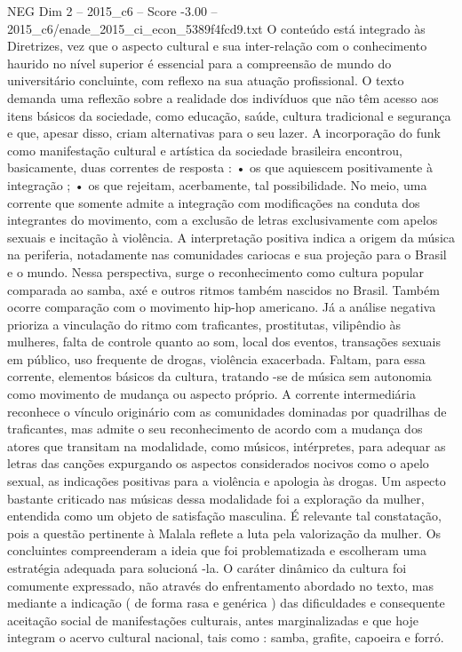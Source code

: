 \begin{textsample}{NEG Dim 2 – 2015\_c6 – Score -3.00 – 2015\_c6/enade\_2015\_ci\_econ\_5389f4fcd9.txt}
O conteúdo está integrado às Diretrizes, vez que o aspecto cultural e sua inter-relação com o conhecimento haurido no nível superior é essencial para a compreensão de mundo do universitário concluinte, com reflexo na sua atuação profissional.
O texto demanda uma reflexão sobre a realidade dos indivíduos que não têm acesso aos itens básicos da sociedade, como educação, saúde, cultura tradicional e segurança e que, apesar disso, criam alternativas para o seu lazer.
A incorporação do funk como manifestação cultural e artística da sociedade brasileira encontrou, basicamente, duas correntes de resposta : • os que aquiescem positivamente à integração ; • os que rejeitam, acerbamente, tal possibilidade.
No meio, uma corrente que somente admite a integração com modificações na conduta dos integrantes do movimento, com a exclusão de letras exclusivamente com apelos sexuais e incitação à violência.
A interpretação positiva indica a origem da música na periferia, notadamente nas comunidades cariocas e sua projeção para o Brasil e o mundo.
Nessa perspectiva, surge o reconhecimento como cultura popular comparada ao samba, axé e outros ritmos também nascidos no Brasil.
Também ocorre comparação com o movimento hip-hop americano.
Já a análise negativa prioriza a vinculação do ritmo com traficantes, prostitutas, vilipêndio às mulheres, falta de controle quanto ao som, local dos eventos, transações sexuais em público, uso frequente de drogas, violência exacerbada.
Faltam, para essa corrente, elementos básicos da cultura, tratando -se de música sem autonomia como movimento de mudança ou aspecto próprio.
A corrente intermediária reconhece o vínculo originário com as comunidades dominadas por quadrilhas de traficantes, mas admite o seu reconhecimento de acordo com a mudança dos atores que transitam na modalidade, como músicos, intérpretes, para adequar as letras das canções expurgando os aspectos considerados nocivos como o apelo sexual, as indicações positivas para a violência e apologia às drogas.
Um aspecto bastante criticado nas músicas dessa modalidade foi a exploração da mulher, entendida como um objeto de satisfação masculina.
É relevante tal constatação, pois a questão pertinente à Malala reflete a luta pela valorização da mulher.
Os concluintes compreenderam a ideia que foi problematizada e escolheram uma estratégia adequada para solucioná -la.
O caráter dinâmico da cultura foi comumente expressado, não através do enfrentamento abordado no texto, mas mediante a indicação ( de forma rasa e genérica ) das dificuldades e consequente aceitação social de manifestações culturais, antes marginalizadas e que hoje integram o acervo cultural nacional, tais como : samba, grafite, capoeira e forró.

\end{textsample}
